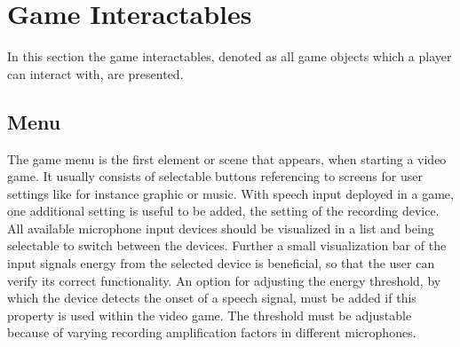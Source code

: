 
\section{Game Interactables}
\thesisStateNotReady
In this section the game interactables, denoted as all game objects which a player can interact with, are presented.

\subsection{Menu}
The game menu is the first element or scene that appears, when starting a video game. 
It usually consists of selectable buttons referencing to screens for user settings like for instance graphic or music.
With speech input deployed in a game, one additional setting is useful to be added, the setting of the recording device.
All available microphone input devices should be visualized in a list and being selectable to switch between the devices.
Further a small visualization bar of the input signals energy from the selected device is beneficial, so that the user can verify its correct functionality.
An option for adjusting the energy threshold, by which the device detects the onset of a speech signal, must be added if this property is used within the video game.
The threshold must be adjustable because of varying recording amplification factors in different microphones.
